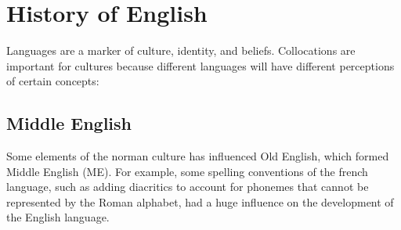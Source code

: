 \documentclass[../main.tex]{subfiles}
\begin{document}
	\section{History of English}
	Languages are a marker of culture, identity, and beliefs.
	Collocations are important for cultures because different languages will have different perceptions of certain concepts:

	\subsection{Middle English}
	Some elements of the norman culture has influenced Old English, which formed Middle English (ME). For example, some spelling conventions of the french language, such as adding diacritics to account for phonemes that cannot be represented by the Roman alphabet, had a huge influence on the development of the English language.
\end{document}
